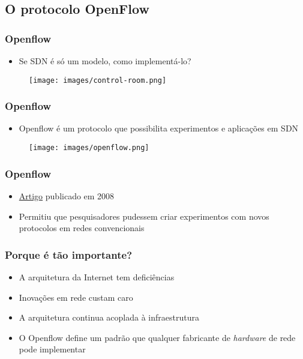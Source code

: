 
\subsection{O protocolo OpenFlow}

%
%
\begin{frame}\frametitle{Openflow}

    \begin{itemize}
    \item Se SDN é só um modelo, como implementá-lo?
    \end{itemize}
    	\begin{figure}[h]
        \centering
        \texttt{[image: images/control-room.png]}
    \end{figure}
\end{frame}



%
%
\begin{frame}\frametitle{Openflow}

    \begin{itemize}
    \item Openflow é um protocolo que possibilita experimentos e aplicações
          em SDN
    \end{itemize}
    	\begin{figure}[h]
        \centering
        \texttt{[image: images/openflow.png]}
    \end{figure}
\end{frame}


%
%
\begin{frame}\frametitle{Openflow}

    \begin{itemize}
    \item \href{http://archive.openflow.org/documents/openflow-wp-latest.pdf}{Artigo} publicado em 2008 
    \item Permitiu que pesquisadores pudessem criar experimentos com novos
          protocolos em redes convencionais 
    \end{itemize}

\end{frame}




%
%
\begin{frame}\frametitle{Porque é tão importante?}

    \begin{itemize}
    \item A arquitetura da Internet tem deficiências
    \item Inovações em rede custam caro
    \item A arquitetura continua acoplada à infraestrutura
    \item O Openflow define um padrão que qualquer fabricante de     
          \emph{hardware} de rede pode implementar
    \end{itemize}

\end{frame}
